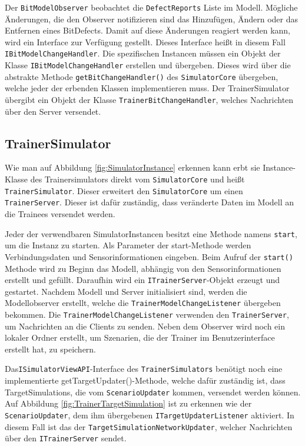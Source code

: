 \sloppy
Der \texttt{BitModelObserver} beobachtet die \texttt{DefectReports} Liste im Modell. Mögliche Änderungen, die den Observer notifizieren sind das Hinzufügen, Ändern oder das Entfernen eines BitDefects. Damit auf diese Änderungen reagiert werden kann, wird ein Interface zur Verfügung gestellt. Dieses Interface heißt in diesem Fall \texttt{IBitModelChangeHandler}.
Die spezifischen Instancen müssen ein Objekt der Klasse \texttt{IBitModelChangeHandler} erstellen und übergeben. Dieses wird über die abstrakte Methode \texttt{getBitChangeHandler()} des \texttt{SimulatorCore} übergeben, welche jeder der erbenden Klassen implementieren muss. Der TrainerSimulator übergibt ein Objekt der Klasse \texttt{TrainerBitChangeHandler}, welches Nachrichten über den Server versendet.

\subsection{TrainerSimulator}
Wie man auf Abbildung \ref{fig:SimulatorInstance} erkennen kann erbt sie Instance-Klasse des Trainersimulators direkt vom \texttt{SimulatorCore} und heißt \texttt{TrainerSimulator}. Dieser erweitert den \texttt{SimulatorCore} um einen \texttt{TrainerServer}. Dieser ist dafür zuständig, dass veränderte Daten im Modell an die Trainees versendet werden.

Jeder der verwendbaren SimulatorInstancen besitzt eine Methode namens \texttt{start}, um die Instanz zu starten. Als Parameter der start-Methode werden Verbindungsdaten und Sensorinformationen eingeben. Beim Aufruf der \texttt{start()} Methode wird zu Beginn das Modell, abhängig von den Sensorinformationen erstellt und gefüllt. Daraufhin wird ein \texttt{ITrainerServer}-Objekt erzeugt und gestartet. Nachdem Modell und Server initialisiert sind, werden die Modellobserver erstellt, welche die \texttt{TrainerModelChangeListener} übergeben bekommen. Die \texttt{TrainerModelChangeListener} verwenden den \texttt{TrainerServer}, um Nachrichten an die Clients zu senden. Neben dem Observer wird noch ein lokaler Ordner erstellt, um Szenarien, die der Trainer im Benutzerinterface erstellt hat, zu speichern.

Das\texttt{ISimulatorViewAPI}-Interface des \texttt{TrainerSimulators} benötigt noch eine  implementierte {getTargetUpdater()}-Methode, welche dafür zuständig ist, dass TargetSimulations, die vom \texttt{ScenarioUpdater} kommen, versendet werden können. Auf Abbildung \ref{fig:TrainerTargetSimulation} ist zu erkennen wie der \texttt{ScenarioUpdater}, dem ihm übergebenen \texttt{ITargetUpdaterListener} aktiviert. In diesem Fall ist das der \texttt{TargetSimulationNetworkUpdater}, welcher Nachrichten über den \texttt{ITrainerServer} sendet.

